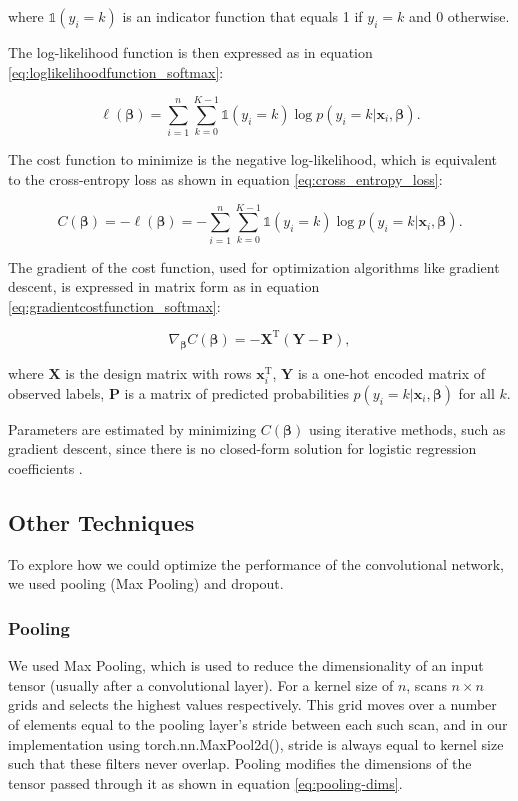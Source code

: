 where $\mathbb{1}(y_i = k)$ is an indicator function that equals 1 if $y_i = k$ and 0 otherwise.

The log-likelihood function is then expressed as in equation \ref{eq:loglikelihoodfunction_softmax}:

\begin{equation}
\ell(\boldsymbol{\beta}) = \sum_{i=1}^n \sum_{k=0}^{K-1} \mathbb{1}(y_i = k) \log p(y_i = k \vert \boldsymbol{x}_i, \boldsymbol{\beta}).
\label{eq:loglikelihoodfunction_softmax}
\end{equation}

The cost function to minimize is the negative log-likelihood, which is equivalent to the cross-entropy loss as shown in equation \ref{eq:cross_entropy_loss}:

\begin{equation}
C(\boldsymbol{\beta}) = -\ell(\boldsymbol{\beta}) = -\sum_{i=1}^n \sum_{k=0}^{K-1} \mathbb{1}(y_i = k) \log p(y_i = k \vert \boldsymbol{x}_i, \boldsymbol{\beta}).
\label{eq:cross_entropy_loss}
\end{equation}

The gradient of the cost function, used for optimization algorithms like gradient descent, is expressed in matrix form as in equation \ref{eq:gradientcostfunction_softmax}:

\begin{equation}
\nabla_{\boldsymbol{\beta}} C(\boldsymbol{\beta}) = -\mathbf{X}^\mathrm{T} (\mathbf{Y} - \mathbf{P}),
\label{eq:gradientcostfunction_softmax}
\end{equation}

where $\mathbf{X}$ is the design matrix with rows $\boldsymbol{x}_i^\mathrm{T}$, $\mathbf{Y}$ is a one-hot encoded matrix of observed labels, $\mathbf{P}$ is a matrix of predicted probabilities $p(y_i = k \vert \boldsymbol{x}_i, \boldsymbol{\beta})$ for all $k$.

Parameters are estimated by minimizing $C(\boldsymbol{\beta})$ using iterative methods, such as gradient descent, since there is no closed-form solution for logistic regression coefficients \cite{Hjorth-Jensen_MachineLearning_2023}.

\subsection{Other Techniques}
To explore how we could optimize the performance of the convolutional network, we used pooling (Max Pooling) and dropout.

\subsubsection{Pooling}
We used Max Pooling, which is used to reduce the dimensionality of an input tensor (usually after a convolutional layer). For a kernel size of $n$, scans $n\times n$ grids and selects the highest values respectively. This grid moves over a number of elements equal to the pooling layer's stride between each such scan, and in our implementation using torch.nn.MaxPool2d(), stride is always equal to kernel size such that these filters never overlap. Pooling modifies the dimensions of the tensor passed through it as shown in equation \ref{eq:pooling-dims}.

